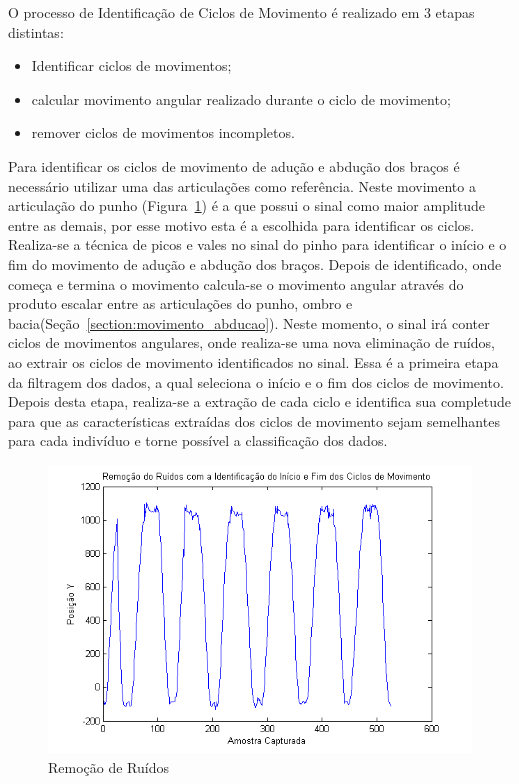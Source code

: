 O processo de Identificação de Ciclos de Movimento é realizado em 3 etapas distintas:
\begin{itemize}
	\item Identificar ciclos de movimentos;
	\item calcular movimento angular realizado durante o ciclo de movimento;
	\item remover ciclos de movimentos incompletos.
\end{itemize}

Para identificar os ciclos de movimento de adução e abdução dos braços é necessário utilizar uma das articulações como referência. Neste movimento a articulação do punho (Figura~\ref{img:remocaoruidossinal}) é a que possui o sinal como maior amplitude entre as demais, por esse motivo esta é a escolhida para identificar os ciclos. Realiza-se a técnica de picos e vales no sinal do pinho para identificar o início e o fim do movimento de adução e abdução dos braços. Depois de identificado, onde começa e termina o movimento calcula-se o movimento angular através do produto escalar entre as articulações do punho, ombro e bacia(Seção~\ref{section:movimento_abducao}). Neste momento, o sinal irá conter ciclos de movimentos angulares, onde realiza-se uma nova eliminação de ruídos, ao extrair os ciclos de movimento identificados no sinal. Essa é a primeira etapa da filtragem dos dados, a qual seleciona o início e o fim dos ciclos de movimento. Depois desta etapa, realiza-se a extração de cada ciclo e identifica sua 
completude para que as características extraídas dos ciclos de movimento sejam semelhantes para cada indivíduo e torne possível a classificação dos dados.

\begin{figure}[!htb]
     \centering
     \includegraphics[width=1\textwidth]{./img/remocaoruidociclo.png}
     \caption{Remoção de Ruídos}
     \label{img:remocaoruidossinal}
\end{figure}


